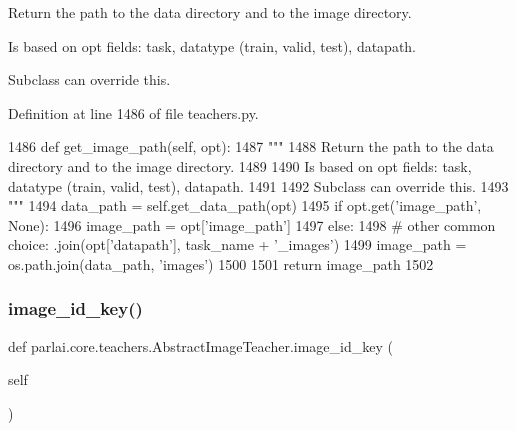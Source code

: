 \begin{DoxyVerb}Return the path to the data directory and to the image directory.

Is based on opt fields: task, datatype (train, valid, test), datapath.

Subclass can override this.
\end{DoxyVerb}
 

Definition at line 1486 of file teachers.\+py.


\begin{DoxyCode}
1486     \textcolor{keyword}{def }get\_image\_path(self, opt):
1487         \textcolor{stringliteral}{"""}
1488 \textcolor{stringliteral}{        Return the path to the data directory and to the image directory.}
1489 \textcolor{stringliteral}{}
1490 \textcolor{stringliteral}{        Is based on opt fields: task, datatype (train, valid, test), datapath.}
1491 \textcolor{stringliteral}{}
1492 \textcolor{stringliteral}{        Subclass can override this.}
1493 \textcolor{stringliteral}{        """}
1494         data\_path = self.get\_data\_path(opt)
1495         \textcolor{keywordflow}{if} opt.get(\textcolor{stringliteral}{'image\_path'}, \textcolor{keywordtype}{None}):
1496             image\_path = opt[\textcolor{stringliteral}{'image\_path'}]
1497         \textcolor{keywordflow}{else}:
1498             \textcolor{comment}{# other common choice: .join(opt['datapath'], task\_name + '\_images')}
1499             image\_path = os.path.join(data\_path, \textcolor{stringliteral}{'images'})
1500 
1501         \textcolor{keywordflow}{return} image\_path
1502 
\end{DoxyCode}
\mbox{\label{classparlai_1_1core_1_1teachers_1_1AbstractImageTeacher_ada83f1832b7c75f9daab8e4d196ba893}} 
\subsubsection{\texorpdfstring{image\+\_\+id\+\_\+key()}{image\_id\_key()}}
{\footnotesize\ttfamily def parlai.\+core.\+teachers.\+Abstract\+Image\+Teacher.\+image\+\_\+id\+\_\+key (\begin{DoxyParamCaption}\item[{}]{self }\end{DoxyParamCaption})}

